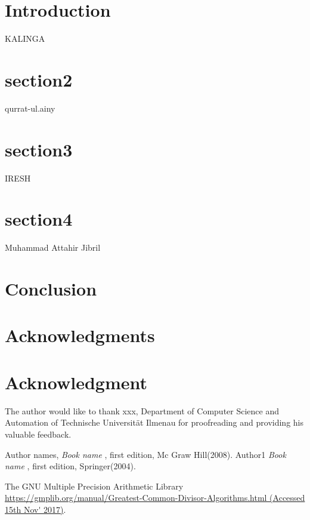 \documentclass[conference]{IEEEtran}
\begin{document}

\section{Introduction}
KALINGA
\section{section2}
 qurrat-ul.ainy
\section{section3}
IRESH
\section{section4}
Muhammad Attahir Jibril
\section{Conclusion}

\ifCLASSOPTIONcompsoc
  \section*{Acknowledgments}
\else
  \section*{Acknowledgment}
\fi
The author would like to thank xxx, Department of Computer Science and Automation of Technische Universität Ilmenau for proofreading and providing his valuable feedback.

\begin{thebibliography}{6}

Author names, \textsl{Book name
},
first edition, Mc Graw Hill(2008).
Author1 \textsl{Book name
},
first edition, Springer(2004).

The GNU Multiple Precision Arithmetic Library \url{https://gmplib.org/manual/Greatest-Common-Divisor-Algorithms.html (Accessed 15th Nov' 2017)}.

\end{thebibliography}

\end{document}
